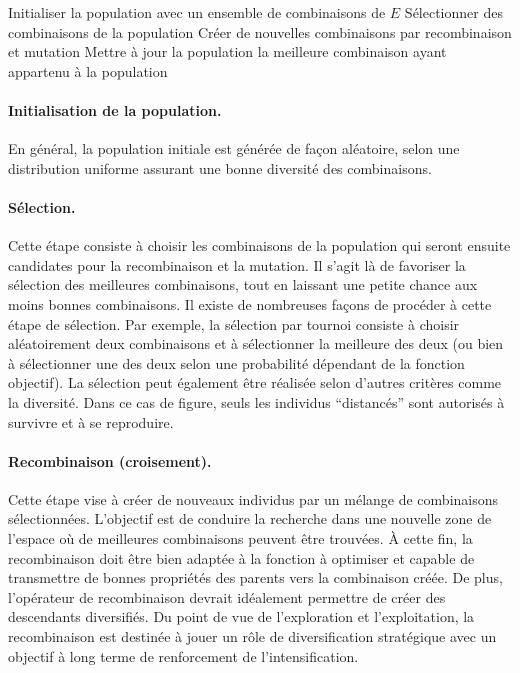 \documentclass[12pt,a4paper]{book}
\begin{document}
\begin{algorithm}[ht]
\caption{Algorithme génétique}
\label{alg:genetique}
\begin{algorithmic}[1]
\State Initialiser la population avec un ensemble de combinaisons de $E$
  \State Sélectionner des combinaisons de la population
  \State Créer de nouvelles combinaisons par recombinaison et mutation
  \State Mettre à jour la population
\EndWhile
\State \Return la meilleure combinaison ayant appartenu à la population
\end{algorithmic}
\end{algorithm}

\paragraph{Initialisation de la population.}
En général, la population initiale est générée de façon aléatoire, selon une distribution uniforme assurant une bonne diversité des combinaisons.

\paragraph{Sélection.}
Cette étape consiste à choisir les combinaisons de la population qui seront ensuite candidates pour la recombinaison et la mutation. Il s'agit là de favoriser la sélection des meilleures combinaisons, tout en laissant une petite chance aux moins bonnes combinaisons. Il existe de nombreuses façons de procéder à cette étape de sélection. Par exemple, la sélection par tournoi consiste à choisir aléatoirement deux combinaisons et à sélectionner la meilleure des deux (ou bien à sélectionner une des deux selon une probabilité dépendant de la fonction objectif). La sélection peut également être réalisée selon d'autres critères comme la diversité. Dans ce cas de figure, seuls les individus ``distancés'' sont autorisés à survivre et à se reproduire.

\paragraph{Recombinaison (croisement).}
Cette étape vise à créer de nouveaux individus par un mélange de combinaisons sélectionnées. L'objectif est de conduire la recherche dans une nouvelle zone de l'espace où de meilleures combinaisons peuvent être trouvées. À cette fin, la recombinaison doit être bien adaptée à la fonction à optimiser et capable de transmettre de bonnes propriétés des parents vers la combinaison créée. De plus, l'opérateur de recombinaison devrait idéalement permettre de créer des descendants diversifiés. Du point de vue de l'exploration et l'exploitation, la recombinaison est destinée à jouer un rôle de diversification stratégique avec un objectif à long terme de renforcement de l'intensification.
\end{document}
